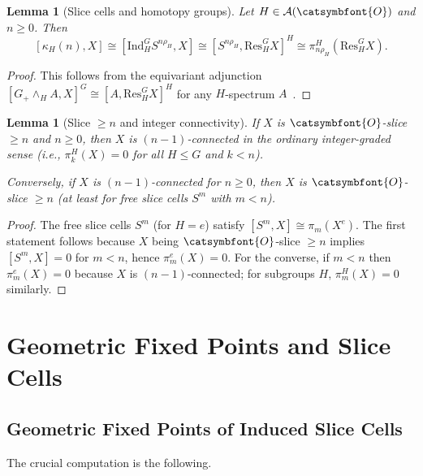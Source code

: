 \documentclass[12pt]{article}
\newcommand{\aO}{{\catsymbfont{O}}}
\newtheorem{lemma}[theorem]{Lemma}
\theoremstyle{definition}
\begin{document}
\begin{lemma}[Slice cells and homotopy groups]\label{lem:slice-cell-htpy}
Let $H\in\mathcal{A}(\aO)$ and $n\geq 0$.  Then
\[
   [\kappa_H(n), X] \cong [\mathrm{Ind}_H^G S^{n\rho_H}, X] \cong [S^{n\rho_H}, \mathrm{Res}^G_H X]^H \cong \pi_{n\rho_H}^H(\mathrm{Res}^G_H X).
\]
\end{lemma}
\begin{proof}
This follows from the equivariant adjunction $[G_+\wedge_H A, X]^G \cong [A, \mathrm{Res}^G_H X]^H$ for any $H$-spectrum $A$~\cite[II.3.3]{LMS}.
\end{proof}

\begin{lemma}[Slice $\geq n$ and integer connectivity]\label{lem:slice-vs-integer}
If $X$ is $\aO$-slice $\geq n$ and $n \geq 0$, then $X$ is $(n-1)$-connected in the ordinary integer-graded sense (i.e., $\pi_k^H(X)=0$ for all $H\leq G$ and $k < n$).

Conversely, if $X$ is $(n-1)$-connected for $n\geq 0$, then $X$ is $\aO$-slice $\geq n$ (at least for free slice cells $S^m$ with $m < n$).
\end{lemma}
\begin{proof}
The free slice cells $S^m$ (for $H=e$) satisfy $[S^m, X] \cong \pi_m(X^e)$.  The first statement follows because $X$ being $\aO$-slice $\geq n$ implies $[S^m, X] = 0$ for $m < n$, hence $\pi_m^e(X) = 0$.  For the converse, if $m < n$ then $\pi_m^e(X) = 0$ because $X$ is $(n-1)$-connected; for subgroups $H$, $\pi_m^H(X)=0$ similarly.
\end{proof}

\section{Geometric Fixed Points and Slice Cells}

\subsection{Geometric Fixed Points of Induced Slice Cells}

The crucial computation is the following.
\end{document}
